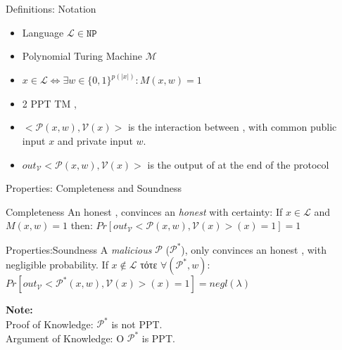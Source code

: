 \documentclass[handout]{beamer}
\begin{document}
\begin{frame}{Definitions: Notation}

\begin{itemize}
\item Language $ \mathcal{L} \in \mathtt{NP}$
\item Polynomial Turing Machine $\mathcal{M}$
\item $x \in \mathcal{L} \Leftrightarrow \exists w \in \{0,1\}^{p(|x|)}: M(x,w) = 1$
\item 2 PPT TM \prv, \ver
\item $<\mathcal{P}(x,w), \mathcal{V}(x)>$ is the interaction between  \prv, \ver with common public input $x$ and private \prv input $w$.
\item $out_\mathcal{V}{<\mathcal{P}(x,w), \mathcal{V}(x)>}$ is the output of \ver at the end of the protocol
\end{itemize}
\end{frame}


\begin{frame}{Properties: Completeness and Soundness}
\begin{block}{Completeness}
An honest \prv, convinces an \emph{honest} \ver with certainty:
If  $x \in \mathcal{L}$ and $M(x,w) = 1$ then:
$ Pr[out_{\mathcal{V}}<\mathcal{P}(x,w), \mathcal{V}(x)>(x)=1] = 1  $
\end{block}

\begin{block}{Properties:Soundness}
A \emph{malicious} $\mathcal{P}$ ($\mathcal{P}^*$),  only convinces an honest \ver, with negligible probability.
If $x \notin \mathcal{L}$ τότε $\forall (\mathcal{P}^*,w)$: 
$ Pr[out_{\mathcal{V}}<\mathcal{P}^*(x,w), \mathcal{V}(x)>(x)=1] = negl(\lambda) $ 
\end{block}

\textbf{Note: }\\
Proof of Knowledge: $\mathcal{P}^*$ is \alert{not} PPT. \\
Argument of Knowledge: O $\mathcal{P}^*$  is PPT.
\end{frame}
\end{document}
